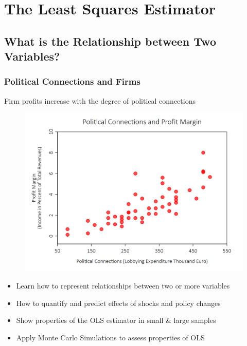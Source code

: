 \documentclass[a4paper,12pt]{article}
\begin{document}
\clearpage
\section{The Least Squares Estimator}
\label{The Least Squares Estimator}

\subsection{What is the Relationship between Two Variables?}



\subsubsection*{Political Connections and Firms}

Firm profits increase with the degree of political connections

\begin{figure}[H]
	\centering
		\includegraphics[width=.9\textwidth]{figures/politicallyconnected1}
   \label{fig:politicallyconnected1}
\end{figure}

\begin{itemize}
	\item Learn how to represent relationships between two or more variables
	\item How to quantify and predict effects of shocks and policy changes
	\item Show properties of the OLS estimator in small \& large samples
	\item Apply Monte Carlo Simulations to assess properties of OLS

\end{itemize}
\end{document}
